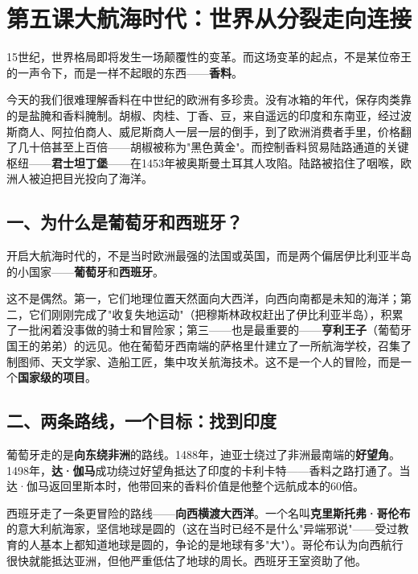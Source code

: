 \documentclass[a4paper,12pt]{ctexart}
\begin{document}
\newpage

\section{\textcolor{orange!80!black}{第五课\quad 大航海时代：世界从分裂走向连接}}

15世纪，世界格局即将发生一场颠覆性的变革。而这场变革的起点，不是某位帝王的一声令下，而是一样不起眼的东西——\textbf{香料}。

今天的我们很难理解香料在中世纪的欧洲有多珍贵。没有冰箱的年代，保存肉类靠的是盐腌和香料腌制。胡椒、肉桂、丁香、豆，来自遥远的印度和东南亚，经过波斯商人、阿拉伯商人、威尼斯商人一层一层的倒手，到了欧洲消费者手里，价格翻了几十倍甚至上百倍——胡椒被称为"黑色黄金"。而控制香料贸易陆路通道的关键枢纽——\textbf{君士坦丁堡}——在1453年被奥斯曼土耳其人攻陷。陆路被掐住了咽喉，欧洲人被迫把目光投向了海洋。

\subsection*{一、为什么是葡萄牙和西班牙？}

开启大航海时代的，不是当时欧洲最强的法国或英国，而是两个偏居伊比利亚半岛的小国家——\textbf{葡萄牙}和\textbf{西班牙}。

这不是偶然。第一，它们地理位置天然面向大西洋，向西向南都是未知的海洋；第二，它们刚刚完成了"收复失地运动"（把穆斯林政权赶出了伊比利亚半岛），积累了一批闲着没事做的骑士和冒险家；第三——也是最重要的——\textbf{亨利王子}（葡萄牙国王的弟弟）的远见。他在葡萄牙西南端的萨格里什建立了一所航海学校，召集了制图师、天文学家、造船工匠，集中攻关航海技术。这不是一个人的冒险，而是一个\textbf{国家级的项目}。

\subsection*{二、两条路线，一个目标：找到印度}

葡萄牙走的是\textbf{向东绕非洲}的路线。1488年，迪亚士绕过了非洲最南端的\textbf{好望角}。1498年，\textbf{达·伽马}成功绕过好望角抵达了印度的卡利卡特——香料之路打通了。当达·伽马返回里斯本时，他带回来的香料价值是他整个远航成本的60倍。

西班牙走了一条更冒险的路线——\textbf{向西横渡大西洋}。一个名叫\textbf{克里斯托弗·哥伦布}的意大利航海家，坚信地球是圆的（这在当时已经不是什么"异端邪说"——受过教育的人基本上都知道地球是圆的，争论的是地球有多"大"）。哥伦布认为向西航行很快就能抵达亚洲，但他严重低估了地球的周长。西班牙王室资助了他。
\end{document}
